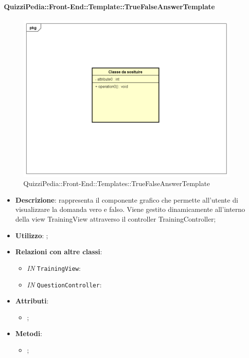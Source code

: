 		\paragraph{QuizziPedia::Front-End::Template::TrueFalseAnswerTemplate}
		
				\label{QuizziPedia::Front-End::Templates::TrueFalseAnswerTemplate}

				\begin{figure}[h]
					\centering
					\includegraphics[scale=0.5,keepaspectratio]{UML/Classi/Front-End/Temporanea.png}
					\caption{QuizziPedia::Front-End::Templates::TrueFalseAnswerTemplate}
				\end{figure}
				
			\begin{itemize}
				\item \textbf{Descrizione}: rappresenta il componente grafico che permette all'utente di visualizzare la domanda vero e falso. Viene gestito dinamicamente all'interno della view TrainingView attraverso il controller TrainingController;
				\item \textbf{Utilizzo}: ;
				\item \textbf{Relazioni con altre classi}: 
				\begin{itemize}
						\item \textit{IN} \texttt{TrainingView}: 
						\item \textit{IN} \texttt{QuestionController}:
				\end{itemize}
				\item \textbf{Attributi}: 
				\begin{itemize}
					\item ;
				\end{itemize}
				\item \textbf{Metodi}: 
				\begin{itemize}
					\item ;
				\end{itemize}
			\end{itemize}
		
